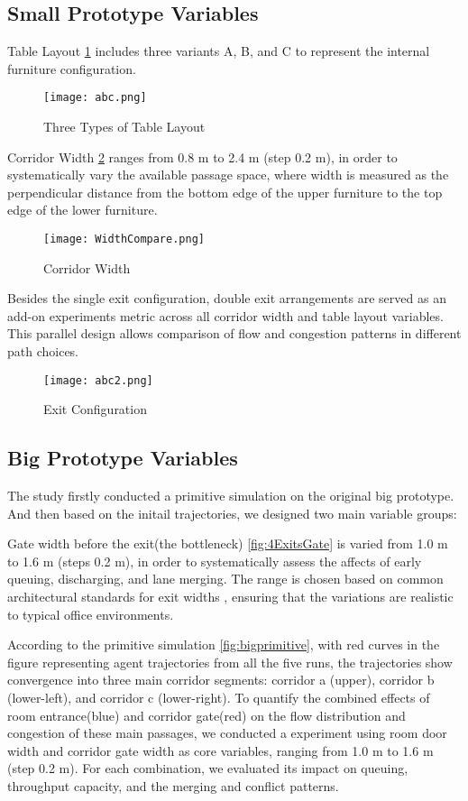 \subsection{Small Prototype Variables}
Table Layout \ref{fig:abc} includes three variants A, B, and C to represent the internal furniture configuration.
\begin{figure}[h]
    \centering
    \texttt{[image: abc.png]}
    \caption{Three Types of Table Layout}
    \label{fig:abc}
\end{figure}

Corridor Width \ref{fig:corridorwidth} ranges from 0.8 m to 2.4 m (step 0.2 m), in order to systematically vary the available passage space, where width is measured as the perpendicular distance from the bottom edge of the upper furniture to the top edge of the lower furniture.  
\begin{figure}[h]
    \centering
    \texttt{[image: WidthCompare.png]}
    \caption{Corridor Width}
    \label{fig:corridorwidth}
\end{figure}

Besides the single exit configuration, double exit arrangements are served as an add-on experiments metric across all corridor width and table layout variables. This parallel design allows comparison of flow and congestion patterns in different path choices. 
\begin{figure}[h]
    \centering
    \texttt{[image: abc2.png]}
    \caption{Exit Configuration}
    \label{fig:ExitConfiguration}
\end{figure}

\subsection{Big Prototype Variables}
The study firstly conducted a primitive simulation on the original big prototype. And then based on the initail trajectories, we designed two main variable groups:

Gate width before the exit(the bottleneck) \ref{fig:4ExitsGate} is varied from 1.0 m to 1.6 m (steps 0.2 m), in order to systematically assess the affects of early queuing, discharging, and lane merging. The range is chosen based on common architectural standards for exit widths \cite{linSimulatingEffectsGate2023}, ensuring that the variations are realistic to typical office environments. 

According to the primitive simulation \ref{fig:bigprimitive}, with red curves in the figure representing agent trajectories from all the five runs, the trajectories show convergence into three main corridor segments: corridor a (upper), corridor b (lower-left), and corridor c (lower-right). To quantify the combined effects of room entrance(blue) and corridor gate(red) on the flow distribution and congestion of these main passages, we conducted a experiment using room door width and corridor gate width as core variables, ranging from 1.0 m to 1.6 m (step 0.2 m). For each combination, we evaluated its impact on queuing, throughput capacity, and the merging and conflict patterns. 

